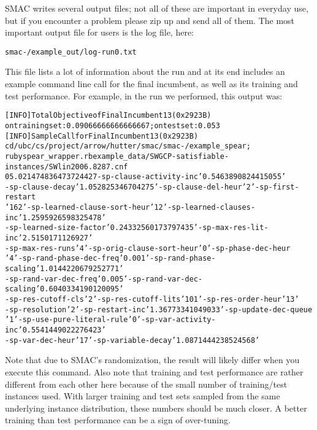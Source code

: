 \documentclass[11pt,letterpaper,twoside]{article}
\begin{document}
SMAC writes several output files; not all of these are important in everyday use, but if you encounter a problem please zip up and send all of them. The most important output file for users is the log file, here:

{\footnotesize
\begin{alltt}
{smac-\version{}\unskip/example_out/log-run0.txt}
\end{alltt}}
This file lists a lot of information about the run and at its end includes an example command line call for the final incumbent, as well as its training and test performance. For example, in the run we performed, this output was:

{\footnotesize
\begin{alltt}
[INFO ] Total Objective of Final Incumbent 13 (0x2923B)
on training set: 0.09066666666666667; on test set: 0.053
[INFO ] Sample Call for Final Incumbent 13 (0x2923B)
cd /ubc/cs/project/arrow/hutter/smac/smac-\version{}\unskip/example\_spear;
ruby spear_wrapper.rb example_data/SWGCP-satisfiable-instances/SWlin2006.8287.cnf
0 5.0 2147483647 3724427 -sp-clause-activity-inc '0.5463890824415055'
-sp-clause-decay '1.052825346704275' -sp-clause-del-heur '2' -sp-first-restart
'162' -sp-learned-clause-sort-heur '12' -sp-learned-clauses-inc '1.2595926598325478'
-sp-learned-size-factor '0.24332560173797435' -sp-max-res-lit-inc '2.5150171126927' 
-sp-max-res-runs '4' -sp-orig-clause-sort-heur '0' -sp-phase-dec-heur
'4' -sp-rand-phase-dec-freq '0.001' -sp-rand-phase-scaling '1.0144220679252771'
-sp-rand-var-dec-freq '0.005' -sp-rand-var-dec-scaling '0.6040334190120095'
-sp-res-cutoff-cls '2' -sp-res-cutoff-lits '101' -sp-res-order-heur '13'
-sp-resolution '2' -sp-restart-inc '1.36773341049033' -sp-update-dec-queue
'1' -sp-use-pure-literal-rule '0' -sp-var-activity-inc '0.5541449022276423'
-sp-var-dec-heur '17' -sp-variable-decay '1.0871444238524568' 
\end{alltt}
}

Note that due to SMAC's randomization, the result will likely differ when you execute this command.
Also note that training and test performance are rather different from each other here because of the small 
number of training/test instances used. With larger training and test sets sampled from the same underlying instance distribution,
these numbers should be much closer. A better training than test performance can be a sign of over-tuning.
\end{document}
